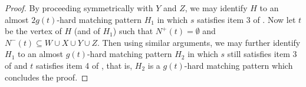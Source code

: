 \begin{proof}
By proceeding symmetrically with $Y$ and $Z$, we may identify $H$ to an almost $2g(t)$-hard matching pattern $H_1$ in which $s$ satisfies item 3 of . 
Now let $t$ be the vertex of $H$ (and of $H_1$) such that $N^+(t) = \emptyset$ and $N^-(t) \subseteq W \cup X \cup Y \cup Z$. Then using similar arguments, we may further identify $H_1$ to an almost $g(t)$-hard matching pattern $H_2$ in which $s$ still satisfies item 3 of  and $t$ satisfies item 4 of , that is, $H_2$ is a $g(t)$-hard matching pattern which concludes the proof. 
\end{proof}